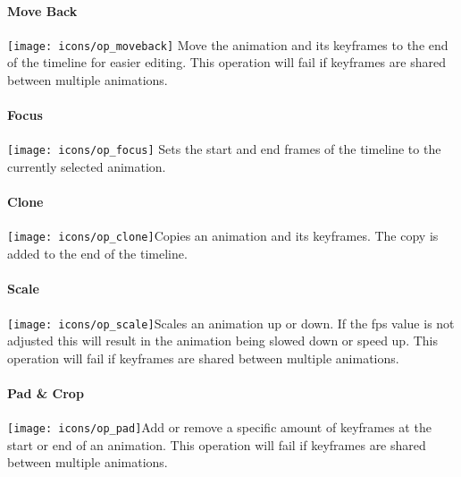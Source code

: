 \paragraph{Move Back}{\texttt{[image: icons/op\_moveback]}} Move the animation and its keyframes to the end of the timeline for easier editing. This operation will fail if keyframes are shared between multiple animations.

\paragraph{Focus}{\texttt{[image: icons/op\_focus]}} Sets the start and end frames of the timeline to the currently selected animation.

\paragraph{Clone}{\texttt{[image: icons/op\_clone]}}Copies an animation and its keyframes. The copy is added to the end of the timeline.
    
\paragraph{Scale}{\texttt{[image: icons/op\_scale]}}Scales an animation up or down. If the fps value is not adjusted this will result in the animation being slowed down or speed up. This operation will fail if keyframes are shared between multiple animations.
    
\paragraph{Pad \& Crop}{\texttt{[image: icons/op\_pad]}}Add or remove a specific amount of keyframes at the start or end of an animation. This operation will fail if keyframes are shared between multiple animations.